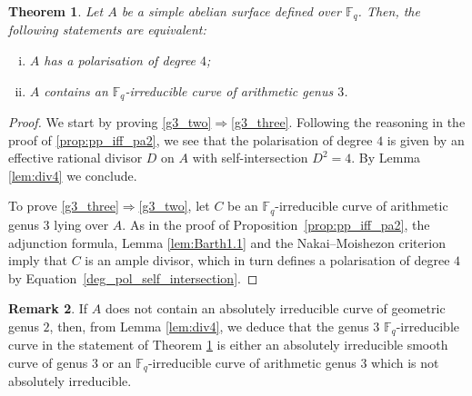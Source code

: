 \documentclass[11pt]{amsart}
\newcommand\Fq{\mathbb{F}_q}
\theoremstyle{plain}
\newtheorem{theorem}{Theorem}[section]
\theoremstyle{definition}
\newtheorem{remark}[theorem]{Remark}
\begin{document}
\begin{theorem}\label{thm:pol_deg_4_iff_pa3}
    Let $A$ be a simple abelian surface defined over $\Fq$. Then, the following statements are equivalent:
    \begin{enumerate}[(i)]
        \item\label{g3_two} $A$ has a polarisation of degree $4$;
        \item\label{g3_three} $A$ contains an $\Fq$-irreducible curve of arithmetic genus $3$.
    \end{enumerate}
\end{theorem}
\begin{proof}
    We start by proving \ref{g3_two}$\Rightarrow$\ref{g3_three}.
    Following the reasoning in the proof of \cref{prop:pp_iff_pa2}, we see that the polarisation of degree $4$ is given by an effective rational divisor $D$ on $A$ with self-intersection $D^2=4$.
    By Lemma \ref{lem:div4} we conclude.

    To prove \ref{g3_three}$\Rightarrow$\ref{g3_two}, let $C$ be an $\Fq$-irreducible curve of arithmetic genus $3$ lying over $A$. 
    As in the proof of Proposition~\ref{prop:pp_iff_pa2}, the adjunction formula, Lemma \ref{lem:Barth1.1} and the Nakai--Moishezon criterion imply that $C$ is an ample divisor, which in turn defines a polarisation of degree $4$ by Equation~\eqref{deg_pol_self_intersection}.
\end{proof}

\begin{remark}
    If $A$ does not contain an absolutely irreducible curve of geometric genus $2$, then, from Lemma \ref{lem:div4}, we deduce that the genus $3$ $\Fq$-irreducible curve in the statement of Theorem \ref{thm:pol_deg_4_iff_pa3} is either an absolutely irreducible smooth curve of genus $3$ or an $\Fq$-irreducible curve of arithmetic genus $3$ which is not absolutely irreducible.
\end{remark}
\end{document}
